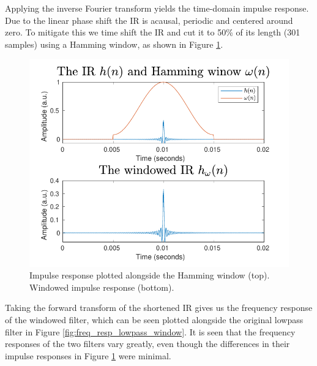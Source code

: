 \documentclass[journal]{IEEEtran}
\begin{document}
Applying the inverse Fourier transform yields the time-domain impulse response. Due to the linear phase shift the IR is acausal, periodic and centered around zero. To mitigate this we time shift the IR and cut it to 50\% of its length (301 samples) using a Hamming window, as shown in Figure \ref{fig:imp_resp_lowpass}. 
\begin{figure}[H]
    \centering
    \includegraphics[width=\columnwidth]{assignment_02/plots/impulse_resp_lowpass_fir_window.pdf}
    \caption{Impulse response plotted alongside the Hamming window (top). Windowed impulse response (bottom).}
    \label{fig:imp_resp_lowpass}
\end{figure}
Taking the forward transform of the shortened IR gives us the frequency response of the windowed filter, which can be seen plotted alongside the original lowpass filter in Figure \ref{fig:freq_resp_lowpass_window}. It is seen that the frequency responses of the two filters vary greatly, even though the differences in their impulse responses in Figure \ref{fig:imp_resp_lowpass} were minimal. 
\end{document}
